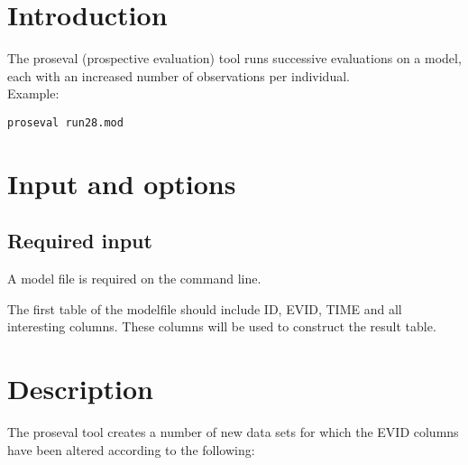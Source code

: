 
\usepackage{hyperref}
\newcommand{\guidetoolname}{proseval}



\maketitle
\tableofcontents
\newpage

\section{Introduction}
The proseval (prospective evaluation) tool runs successive evaluations on a model, each with an increased number of observations per individual.\\
Example:
\begin{verbatim}
proseval run28.mod
\end{verbatim}

\section{Input and options}

\subsection{Required input}
A model file is required on the command line.

The first table of the modelfile should include ID, EVID, TIME and all interesting columns. These columns will be used to
construct the result table.


\section{Description}
The proseval tool creates a number of new data sets for which the EVID columns have been altered according to the following:

